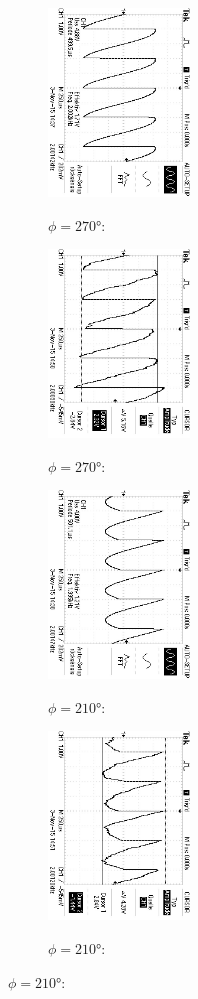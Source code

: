 \begin{figure}
\begin{subfigure}{0.48\textwidth}
\centering
\caption{$\phi=270°$:}
\includegraphics[angle=90,height=5cm]{graphics/ALL0035/F0035TEK.jpg}
\label{fig:phi270o}
\end{subfigure}
\begin{subfigure}{0.48\textwidth}
\centering
\caption{$\phi=270°$:}
\includegraphics[angle=90,height=5cm]{graphics/ALL0043/F0043TEK.jpg}
\label{fig:phi270m}
\end{subfigure}

\begin{subfigure}{0.48\textwidth}
\centering
\caption{$\phi=210°$:}
\includegraphics[angle=90,height=5cm]{graphics/ALL0036/F0036TEK.jpg}
\label{fig:phi210o}
\end{subfigure}
\begin{subfigure}{0.48\textwidth}
\centering
\caption{$\phi=210°$:}
\includegraphics[angle=90,height=5cm]{graphics/ALL0044/F0044TEK.jpg}
\label{fig:phi210m}
\end{subfigure}


\end{figure}
